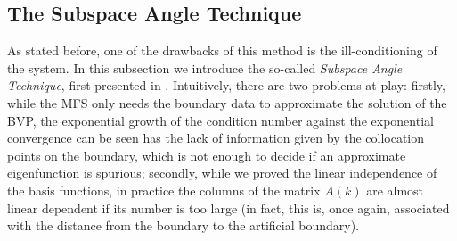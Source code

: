 \subsection{The Subspace Angle Technique}

As stated before, one of the drawbacks of this method is the ill-conditioning of the system. In this subsection we introduce the so-called \textit{Subspace Angle Technique}, first presented in \cite{betcke2005reviving}. Intuitively, there are two problems at play: firstly, while the MFS only needs the boundary data to approximate the solution of the BVP, the exponential growth of the condition number against the exponential convergence can be seen has the lack of information given by the collocation points on the boundary, which is not enough to decide if an approximate eigenfunction is spurious; secondly, while we proved the linear independence of the basis functions, in practice the columns of the matrix \(A(k)\) are almost linear dependent if its number is too large (in fact, this is, once again, associated with the distance from the boundary to the artificial boundary).

